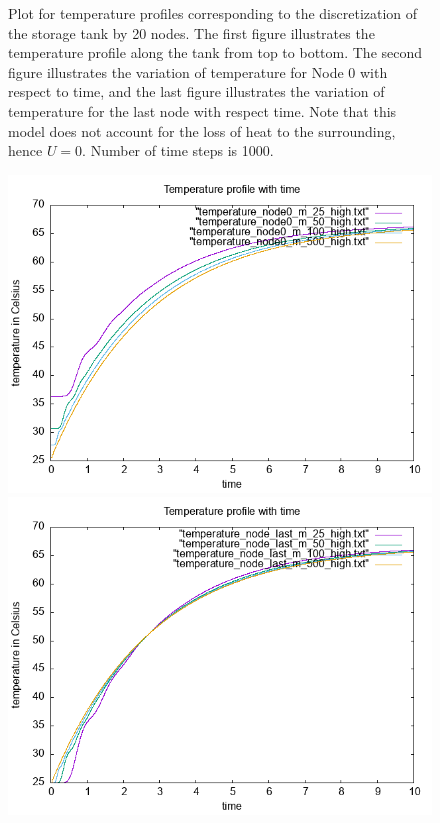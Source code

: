 \documentclass{article}
\begin{document}
\begin{figure}[ht]
\caption{Plot for temperature profiles corresponding to the discretization of the storage tank by 20 nodes. The first figure illustrates the temperature profile along the tank from top to bottom. The second figure illustrates the variation of temperature for Node 0 with respect to time, and the last figure illustrates the variation of temperature for the last node with respect time. Note that this model does not account for the loss of heat to the surrounding, hence $U = 0$. Number of time steps is 1000. }
\end{figure}

\begin{figure}[ht]
\centering
\includegraphics[scale = 0.5]{figures/temperature_node0_mdot.png}
\includegraphics[scale = 0.5]{figures/temperature_node_last_mdot.png}

\end{figure}
\end{document}
